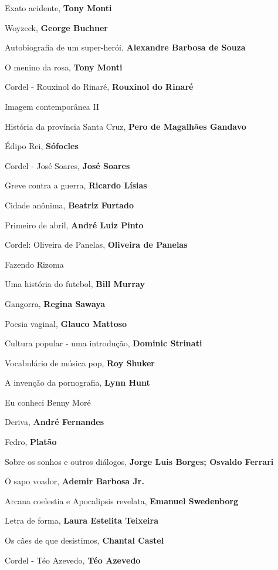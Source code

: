 \begin{multicols}{2}
\begin{enumerate}
{\item Exato acidente, \textbf{Tony Monti}
\item Woyzeck, \textbf{George Buchner}
\item Autobiografia de um super-herói, \textbf{Alexandre Barbosa de Souza}
\item O menino da rosa, \textbf{Tony Monti}
\item Cordel - Rouxinol do Rinaré, \textbf{Rouxinol do Rinaré}
\item Imagem contemporânea II
\item História da província Santa Cruz, \textbf{Pero de Magalhães Gandavo}
\item Édipo Rei, \textbf{Sófocles}
\item Cordel - José Soares, \textbf{José Soares}
\item Greve contra a guerra, \textbf{Ricardo Lísias}
\item Cidade anônima, \textbf{Beatriz Furtado}
\item Primeiro de abril, \textbf{André Luiz Pinto}
\item Cordel: Oliveira de Panelas, \textbf{Oliveira de Panelas}
\item Fazendo Rizoma
\item Uma história do futebol, \textbf{Bill Murray}
\item Gangorra, \textbf{Regina Sawaya}
\item Poesia vaginal, \textbf{Glauco Mattoso}
\item Cultura popular - uma introdução, \textbf{Dominic Strinati}
\item Vocabulário de música pop, \textbf{Roy Shuker}
\item A invenção da pornografia, \textbf{Lynn Hunt}
\item Eu conheci Benny Moré
\item Deriva, \textbf{André Fernandes}
\item Fedro, \textbf{Platão}
\item Sobre os sonhos e outros diálogos, \textbf{Jorge Luis Borges; Osvaldo Ferrari}
\item O sapo voador, \textbf{Ademir Barbosa Jr.}
\item Arcana coelestia e Apocalipsis revelata, \textbf{Emanuel Swedenborg}
\item Letra de forma, \textbf{Laura Estelita Teixeira}
\item Os cães de que desistimos, \textbf{Chantal Castel}
\item Cordel - Téo Azevedo, \textbf{Téo Azevedo}
}
\end{enumerate}
\end{multicols}
